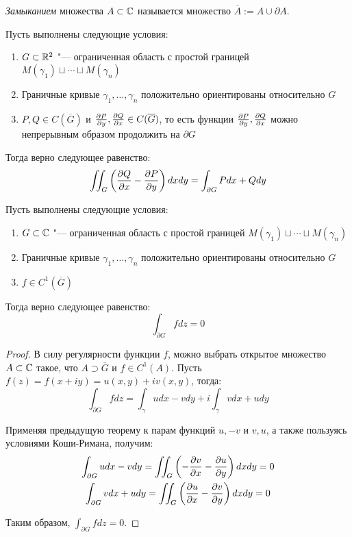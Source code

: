 \begin{definition}
	\textit{Замыканием} множества $A \subset \mathbb{C}$ называется множество $\overline{A} := A \cup \partial A$.
\end{definition}

\begin{theorem}
	Пусть выполнены следующие условия:
	\begin{enumerate}
		\item $G \subset \mathbb{R}^2$ "--- ограниченная область с простой границей $M(\gamma_1) \sqcup \dotsb \sqcup M(\gamma_n)$
		
		\item Граничные кривые $\gamma_1, \dotsc, \gamma_n$ положительно ориентированы относительно $G$
		
		\item $P, Q \in C(\overline{G})$ и $\frac{\partial P}{\partial y}, \frac{\partial Q}{\partial x} \in C(\overline{G})$, то есть функции $\frac{\partial P}{\partial y}, \frac{\partial Q}{\partial x}$ можно непрерывным образом продолжить на $\partial G$
	\end{enumerate}
	
	Тогда верно следующее равенство:
	\[\iint_G\left(\frac{\partial Q}{\partial x} - \frac{\partial P}{\partial y}\right)dxdy = \int_{\partial G} Pdx + Qdy\]
\end{theorem}

\begin{theorem}
	Пусть выполнены следующие условия:
	\begin{enumerate}
		\item $G \subset \mathbb{C}$ "--- ограниченная область с простой границей $M(\gamma_1) \sqcup \dotsb \sqcup M(\gamma_n)$
		
		\item Граничные кривые $\gamma_1, \dotsc, \gamma_n$ положительно ориентированы относительно $G$
		
		\item $f \in C^1(\overline{G})$
	\end{enumerate}

	Тогда верно следующее равенство:
	\[\int_{\partial G} fdz = 0\]
\end{theorem}

\begin{proof}
	В силу регулярности функции $f$, можно выбрать открытое множество $A \subset \mathbb{C}$ такое, что $A \supset \overline{G}$ и $f \in C^1(A)$. Пусть $f(z) = f(x + iy) = u(x, y) + iv(x, y)$, тогда:
	\[\int_{\partial G} fdz = \int_\gamma udx - vdy + i\int_\gamma vdx + udy\]
	
	Применяя предыдущую теорему к парам функций $u, -v$ и $v, u$, а также пользуясь условиями Коши-Римана, получим:
	\begin{gather*}
		\int_{\partial G} udx - vdy  = \iint_G \left(-\frac{\partial v}{\partial x} - \frac{\partial u}{\partial y}\right)dxdy = 0
		\\
		\int_{\partial G} vdx + udy  = \iint_G \left(\frac{\partial u}{\partial x} - \frac{\partial v}{\partial y}\right)dxdy = 0
	\end{gather*}

	Таким образом, $\int_{\partial G} fdz = 0$.
\end{proof}

